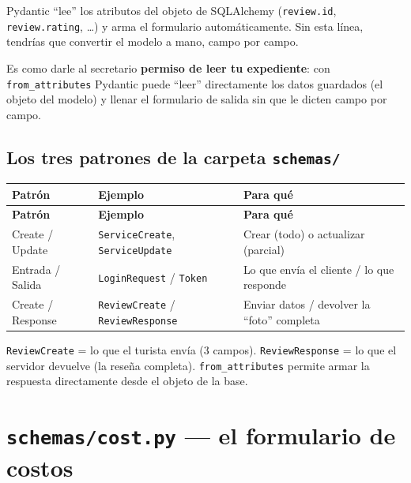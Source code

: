 \documentclass[11pt,a4paper]{article}
\begin{document}
Pydantic ``lee'' los atributos del objeto de SQLAlchemy (\texttt{review.id}, \texttt{review.rating}, \ldots)
y arma el formulario automáticamente. Sin esta línea, tendrías que convertir el modelo a mano,
campo por campo.

\begin{analogia}
Es como darle al secretario \textbf{permiso de leer tu expediente}: con \texttt{from\_attributes}
Pydantic puede ``leer'' directamente los datos guardados (el objeto del modelo) y llenar el
formulario de salida sin que le dicten campo por campo.
\end{analogia}

\subsection{Los \textbf{tres} patrones de la carpeta \texttt{schemas/}}

\begin{center}
{\small
\setlength{\tabcolsep}{4pt}
\begin{longtable}{@{}>{\raggedright\arraybackslash}p{4.3cm}>{\raggedright\arraybackslash}p{5.4cm}>{\raggedright\arraybackslash}p{5.2cm}@{}}
\toprule
\textbf{Patrón} & \textbf{Ejemplo} & \textbf{Para qué} \\
\midrule
\endfirsthead
\toprule
\textbf{Patrón} & \textbf{Ejemplo} & \textbf{Para qué} \\
\midrule
\endhead
Create / Update & \texttt{ServiceCreate}, \texttt{ServiceUpdate} & Crear (todo) o actualizar (parcial) \\
Entrada / Salida & \texttt{LoginRequest} / \texttt{Token} & Lo que envía el cliente / lo que responde \\
Create / Response & \texttt{ReviewCreate} / \texttt{ReviewResponse} & Enviar datos / devolver la ``foto'' completa \\
\bottomrule
\end{longtable}
}
\end{center}

\begin{recuadro}
\texttt{ReviewCreate} = lo que el turista envía (3 campos). \texttt{ReviewResponse} = lo que el
servidor devuelve (la reseña completa). \texttt{from\_attributes} permite armar la respuesta
directamente desde el objeto de la base.
\end{recuadro}

\section{\texttt{schemas/cost.py} --- el formulario de costos}
\end{document}
